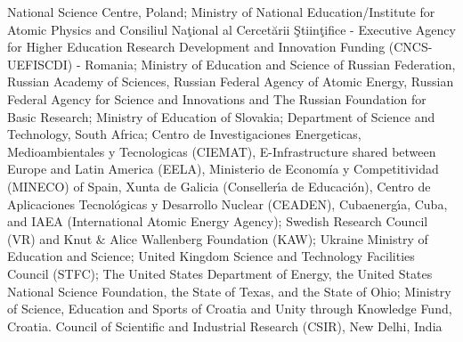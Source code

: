 %
National Science Centre, Poland;
%
Ministry of National Education/Institute for Atomic Physics and
Consiliul Naţional al Cercetării Ştiinţifice -
Executive Agency for Higher Education Research Development and
Innovation Funding (CNCS-UEFISCDI) - Romania;
%
Ministry of Education and Science of Russian Federation, Russian
Academy of Sciences, Russian Federal Agency of Atomic Energy,
Russian Federal Agency for Science and Innovations and The Russian
Foundation for Basic Research;
%
Ministry of Education of Slovakia;
%
Department of Science and Technology, South Africa;
%
Centro de Investigaciones Energeticas,
Medioambientales y Tecnologicas (CIEMAT),
E-Infrastructure shared between Europe and Latin America (EELA),
Ministerio de Econom\'{i}a y Competitividad (MINECO) of Spain,
Xunta de Galicia (Conseller\'{\i}a de Educaci\'{o}n),
Centro de Aplicaciones Tecnológicas y Desarrollo Nuclear (CEA\-DEN),
Cubaenerg\'{\i}a, Cuba, and IAEA (International Atomic Energy Agency);
%
Swedish Research Council (VR) and Knut $\&$ Alice Wallenberg
Foundation (KAW);
%
Ukraine Ministry of Education and Science;
%
United Kingdom Science and Technology Facilities Council (STFC);
%
The United States Department of Energy, the United States National
Science Foundation, the State of Texas, and the State of Ohio;
%
Ministry of Science, Education and
Sports of Croatia and  Unity through Knowledge Fund, Croatia.
%
Council of Scientific and Industrial Research (CSIR), New Delhi, India

